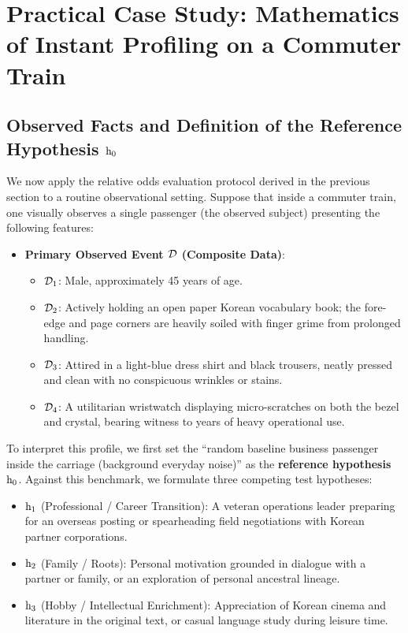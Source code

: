     \section{Practical Case Study: Mathematics of Instant Profiling on a Commuter Train}
    \label{sec:case_commuter_profiling}

    \subsection{Observed Facts and Definition of the Reference Hypothesis $\mathrm{h}_0$}

    We now apply the relative odds evaluation protocol derived in the previous section to a routine observational setting.
    Suppose that inside a commuter train, one visually observes a single passenger (the observed subject) presenting the following features:
    \begin{itemize}
        \item \textbf{Primary Observed Event $\mathcal{D}$ (Composite Data)}:
            \begin{itemize}
                \item $\mathcal{D}_1$: Male, approximately 45 years of age.
                \item $\mathcal{D}_2$: Actively holding an open paper Korean vocabulary book; the fore-edge and page corners are heavily soiled with finger grime from prolonged handling.
                \item $\mathcal{D}_3$: Attired in a light-blue dress shirt and black trousers, neatly pressed and clean with no conspicuous wrinkles or stains.
                \item $\mathcal{D}_4$: A utilitarian wristwatch displaying micro-scratches on both the bezel and crystal, bearing witness to years of heavy operational use.
            \end{itemize}
    \end{itemize}

    To interpret this profile, we first set the ``random baseline business passenger inside the carriage (background everyday noise)'' as the \textbf{reference hypothesis $\mathrm{h}_0$}.
    Against this benchmark, we formulate three competing test hypotheses:
    \begin{itemize}
        \item $\mathrm{h}_1$ (Professional / Career Transition): A veteran operations leader preparing for an overseas posting or spearheading field negotiations with Korean partner corporations.
        \item $\mathrm{h}_2$ (Family / Roots): Personal motivation grounded in dialogue with a partner or family, or an exploration of personal ancestral lineage.
        \item $\mathrm{h}_3$ (Hobby / Intellectual Enrichment): Appreciation of Korean cinema and literature in the original text, or casual language study during leisure time.
    \end{itemize}

